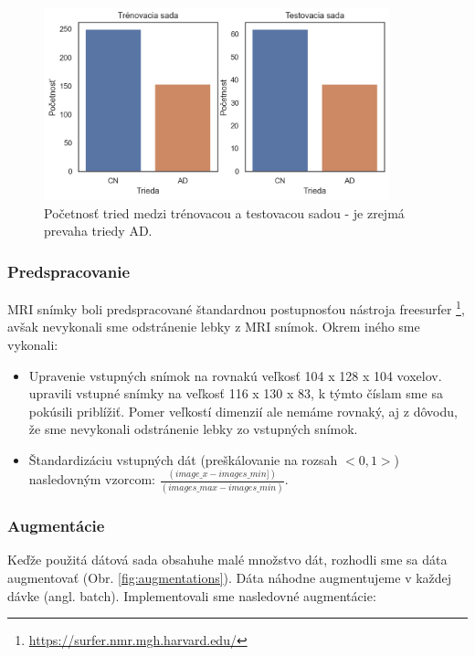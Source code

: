 \begin{figure}[h!]
    \centering
    \includegraphics[width=10cm]{assets/images/dataset_classes.png}
    \caption{Početnosť tried medzi trénovacou a testovacou sadou - je zrejmá prevaha triedy AD.}
    \label{fig:dataset_classes}
\end{figure}

\subsubsection{Predspracovanie}

MRI snímky boli predspracované štandardnou postupnosťou nástroja freesurfer \footnote{\url{https://surfer.nmr.mgh.harvard.edu/}}, avšak nevykonali sme odstránenie lebky z MRI snímok.
Okrem iného sme vykonali:

\begin{itemize}
    \item Upravenie vstupných snímok na rovnakú veľkosť 104 x 128 x 104 voxelov. \citeauthor*{esmaeilzadeh2018end} upravili vstupné snímky na veľkosť 116 x 130 x 83, k týmto číslam sme sa pokúsili priblížiť. Pomer veľkostí dimenzií ale nemáme rovnaký, aj z dôvodu, že sme nevykonali odstránenie lebky zo vstupných snímok.
    \item Štandardizáciu vstupných dát (preškálovanie na rozsah $<0, 1>$) nasledovným vzorcom: $\frac{(image\_x - images\_min])}{(images\_max - images\_min)}$.
\end{itemize}

\subsubsection{Augmentácie}

Keďže použitá dátová sada obsahuhe malé množstvo dát, rozhodli sme sa dáta augmentovať (Obr. \ref{fig:augmentations}). Dáta náhodne augmentujeme v každej dávke (angl. batch). Implementovali sme nasledovné augmentácie:

